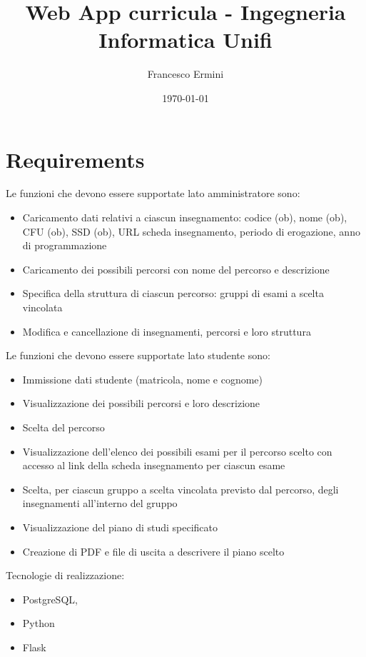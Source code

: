 \documentclass{article}
\title{Web App curricula - Ingegneria Informatica Unifi} %
\author{Francesco Ermini}
\date{\today} %
\begin{document}
\maketitle

\section{Requirements}
Le funzioni che devono essere supportate lato amministratore sono:
\begin{itemize}
\item Caricamento dati relativi a ciascun insegnamento: codice (ob), nome (ob), CFU (ob),
SSD (ob), URL scheda insegnamento, periodo di erogazione, anno di
programmazione
\item Caricamento dei possibili percorsi con nome del percorso e descrizione
\item Specifica della struttura di ciascun percorso: gruppi di esami a scelta vincolata
\item Modifica e cancellazione di insegnamenti, percorsi e loro struttura
\end{itemize}
Le funzioni che devono essere supportate lato studente sono:
\begin{itemize}
\item Immissione dati studente (matricola, nome e cognome)
\item Visualizzazione dei possibili percorsi e loro descrizione
\item Scelta del percorso
\item Visualizzazione dell'elenco dei possibili esami per il percorso scelto con accesso al link della scheda insegnamento per ciascun esame
\item Scelta, per ciascun gruppo a scelta vincolata previsto dal percorso, degli insegnamenti all'interno del gruppo
\item Visualizzazione del piano di studi specificato
\item Creazione di PDF e file di uscita a descrivere il piano scelto
\end{itemize}
Tecnologie di realizzazione:
\begin{itemize} 
\item  PostgreSQL, 
\item  Python
\item  Flask
\end{itemize}
\end{document}
